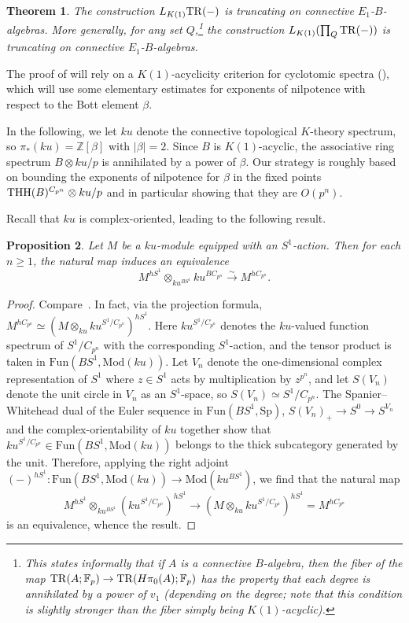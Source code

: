 \documentclass{amsart}
\renewcommand{\mod}{\mathrm{Mod}}
\renewcommand{\sp}{\mathrm{Sp}}
\newtheorem{theorem}{Theorem}[section]
\newtheorem{proposition}[theorem]{Proposition}
\theoremstyle{definition}
\newcommand{\fun}{\mathrm{Fun}}
\begin{document}
\begin{theorem} 
\label{truncatingthm}
The construction $L_{K(1)} \mathrm{TR}(-)$ is truncating on connective
$E_1$-$B$-algebras.
More generally, for any set $Q$,\footnote{This states informally that if $A$ is
a connective $B$-algebra, then the fiber of the map $\mathrm{TR}(A; \mathbb{F}_p) \to \mathrm{TR}(H\pi_0(A);
\mathbb{F}_p)$
has the property that each degree is annihilated by a power of $v_1$ 
(depending on the degree; note that this condition is slightly stronger than the
fiber simply being $K(1)$-acyclic).} the construction $L_{K(1)} (\prod_Q \mathrm{TR}(-))$ is
truncating on connective $E_1$-$B$-algebras. 
\end{theorem} 

The proof of 
 will rely on a $K(1)$-acyclicity criterion for 
cyclotomic spectra (), which will use
some elementary estimates for exponents of nilpotence 
with respect to the Bott element $\beta$. 

In the following, we let $ku$ denote the connective topological $K$-theory
spectrum, so $\pi_*(ku) = \mathbb{Z}[\beta]$ with $|\beta| = 2$. 
Since $B$ is $K(1)$-acyclic, the 
associative ring spectrum $B \otimes ku/p$ is annihilated by a power of $\beta$. 
Our strategy is roughly based on bounding the exponents of nilpotence for $\beta$ 
in the fixed points $\mathrm{THH}(B)^{C_{p^n}} \otimes ku/p$ and in particular
showing that they are
$O(p^n)$. 



Recall that $ku$ is complex-oriented, leading to the following result. 



\begin{proposition} 
\label{kunnethM}
Let $M$ be a $ku$-module equipped with an $S^1$-action. Then for each $n \geq
1$, the natural map 
induces an equivalence
\begin{equation} \label{Mhs1cp}  M^{hS^1} \otimes_{ku^{BS^1}} ku^{BC_{p^n}} \xrightarrow{\sim} M^{hC_{p^n}}
. \end{equation}
\end{proposition} 
\begin{proof} 
Compare~\cite[Sec.~7.4]{MNN17}. 
In fact, via the projection formula, $M^{hC_{p^n}} \simeq (M \otimes_{ku}
ku^{S^1/C_{p^n}})^{hS^1}$.  Here
$ku^{S^1/C_{p^n}}$ denotes the $ku$-valued function spectrum of $S^1/C_{p^n}$ with the
corresponding $S^1$-action, and the tensor product is taken in $\fun(BS^1, \mod(ku))$. 
Let $V_n$ denote the one-dimensional complex representation
of $S^1$ where $z \in S^1$ acts by multiplication by $z^{p^n}$, and let $S(V_n)$
denote the unit circle in $V_n$ as an $S^1$-space, so $S(V_n) \simeq
S^1/C_{p^n}$. 
The Spanier--Whitehead dual of the Euler sequence 
in $\fun(BS^1, \sp)$,
$S(V_n)_+ \to S^0 \to S^{V_n} $ 
and the complex-orientability of $ku$ together show that 
$ku^{S^1/C_{p^n}} \in \fun(BS^1, \mod(ku))$ belongs to the thick subcategory
generated by the unit. 
Therefore, applying the right adjoint
$(-)^{hS^1} \colon \fun(BS^1, \mod(ku)) \to \mod(ku^{BS^1})$, we find that the natural map 
\[ M^{hS^1} \otimes_{ku^{BS^1}} (ku^{S^1/C_{p^n}})^{hS^1} \to (M \otimes_{ku}
ku^{S^1/C_{p^n}})^{hS^1} = M^{hC_{p^n}}  \]
is an equivalence, whence the result. 
\end{proof} 
\end{document}

